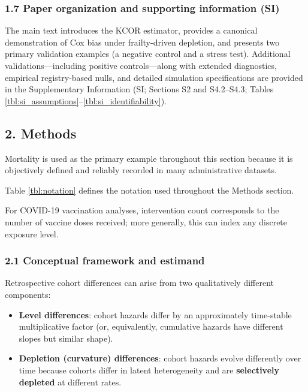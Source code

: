 \documentclass[
]{article}
\providecommand{\tightlist}{%
  \setlength{\itemsep}{0pt}\setlength{\parskip}{0pt}}
\begin{document}
\subsubsection{1.7 Paper organization and supporting information
(SI)}\label{paper-organization-and-supporting-information-si}

The main text introduces the KCOR estimator, provides a canonical
demonstration of Cox bias under frailty-driven depletion, and presents
two primary validation examples (a negative control and a stress test).
Additional validations---including positive controls---along with
extended diagnostics, empirical registry-based nulls, and detailed
simulation specifications are provided in the Supplementary Information
(SI; Sections S2 and S4.2--S4.3; Tables
\ref{tbl:si_assumptions}--\ref{tbl:si_identifiability}).

\subsection{2. Methods}\label{methods}

Mortality is used as the primary example throughout this section because
it is objectively defined and reliably recorded in many administrative
datasets.

Table \ref{tbl:notation} defines the notation used throughout the
Methods section.

For COVID-19 vaccination analyses, intervention count corresponds to the
number of vaccine doses received; more generally, this can index any
discrete exposure level.

\subsubsection{2.1 Conceptual framework and
estimand}\label{conceptual-framework-and-estimand}

Retrospective cohort differences can arise from two qualitatively
different components:

\begin{itemize}
\tightlist
\item
  \textbf{Level differences}: cohort hazards differ by an approximately
  time-stable multiplicative factor (or, equivalently, cumulative
  hazards have different slopes but similar shape).
\item
  \textbf{Depletion (curvature) differences}: cohort hazards evolve
  differently over time because cohorts differ in latent heterogeneity
  and are \textbf{selectively depleted} at different rates.
\end{itemize}
\end{document}
